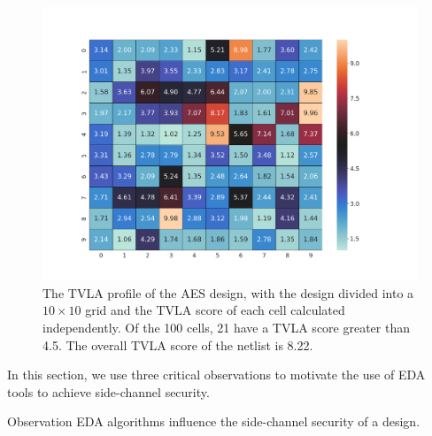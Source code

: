 \begin{figure}[t!]
\centering
  \includegraphics[scale=0.20]{Chapter4/fig/aes_before.png}  
\caption{The TVLA profile of the AES design, with the design divided into a $10\times 10$ grid and the TVLA score of each cell calculated independently. Of the 100 cells, 21 have a TVLA score greater than 4.5. The overall TVLA score of the netlist is 8.22. }
\label{fig:aesopt}
\end{figure}

In this section, we use three critical observations to motivate the use of EDA tools to achieve side-channel security.

\begin{namedthm}{Observation}
EDA algorithms influence the side-channel security of a design.
\end{namedthm}

